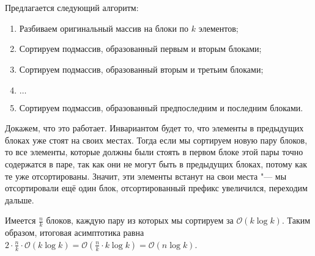 \section{}
	Предлагается следующий алгоритм:
	\begin{enumerate}
		\item Разбиваем оригинальный массив на блоки по $k$ элементов;
		\item Сортируем подмассив, образованный первым и вторым блоками;
		\item Сортируем подмассив, образованный вторым и третьим блоками;
		\item $\dotsc$
		\item Сортируем подмассив, образованный предпоследним и последним блоками.
	\end{enumerate}

	Докажем, что это работает. Инвариантом будет то, что элементы в предыдущих блоках уже стоят на своих местах. Тогда если мы сортируем новую пару блоков, то все элементы, которые должны были стоять в первом блоке этой пары точно содержатся в паре, так как они не могут быть в предыдущих блоках, потому как те уже отсортированы. Значит, эти элементы встанут на свои места "--- мы отсортировали ещё один блок, отсортированный префикс увеличился, переходим дальше.
	
	Имеется $\frac{n}{k}$ блоков, каждую пару из которых мы сортируем за $\mathcal{O}(k\log k)$. Таким образом, итоговая асимптотика равна $2\cdot\frac{n}{k}\cdot\mathcal{O}(k\log k) = \mathcal{O}(\frac{n}{k}\cdot k\log k) = \mathcal{O}(n\log k)$.